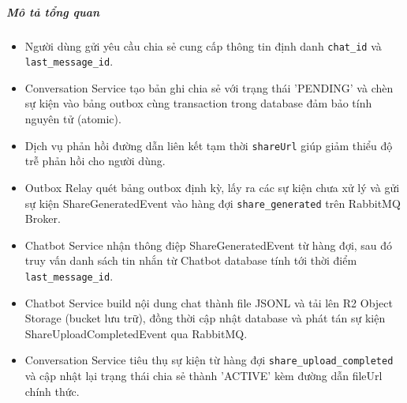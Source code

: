 \subparagraph{Mô tả tổng quan}

\begin{itemize}
\item Người dùng gửi yêu cầu chia sẻ cung cấp thông tin định danh \texttt{chat\_id} và \texttt{last\_message\_id}.
\item Conversation Service tạo bản ghi chia sẻ với trạng thái 'PENDING' và chèn sự kiện vào bảng outbox cùng transaction trong database đảm bảo tính nguyên tử (atomic).
\item Dịch vụ phản hồi đường dẫn liên kết tạm thời \texttt{shareUrl} giúp giảm thiểu độ trễ phản hồi cho người dùng.
\item Outbox Relay quét bảng outbox định kỳ, lấy ra các sự kiện chưa xử lý và gửi sự kiện ShareGeneratedEvent vào hàng đợi \texttt{share\_generated} trên RabbitMQ Broker.
\item Chatbot Service nhận thông điệp ShareGeneratedEvent từ hàng đợi, sau đó truy vấn danh sách tin nhắn từ Chatbot database tính tới thời điểm \texttt{last\_message\_id}.
\item Chatbot Service build nội dung chat thành file JSONL và tải lên R2 Object Storage (bucket lưu trữ), đồng thời cập nhật database và phát tán sự kiện ShareUploadCompletedEvent qua RabbitMQ.
\item Conversation Service tiêu thụ sự kiện từ hàng đợi \texttt{share\_upload\_completed} và cập nhật lại trạng thái chia sẻ thành 'ACTIVE' kèm đường dẫn fileUrl chính thức.
\end{itemize}
